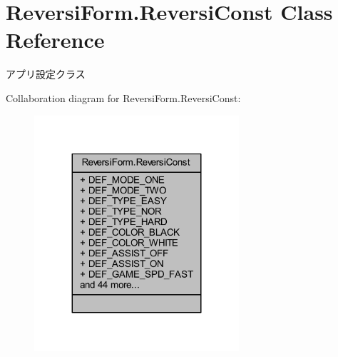 \hypertarget{class_reversi_form_1_1_reversi_const}{}\section{Reversi\+Form.\+Reversi\+Const Class Reference}
\label{class_reversi_form_1_1_reversi_const}


アプリ設定クラス  




Collaboration diagram for Reversi\+Form.\+Reversi\+Const\+:
\nopagebreak
\begin{figure}[H]
\begin{center}
\leavevmode
\includegraphics[width=215pt]{class_reversi_form_1_1_reversi_const__coll__graph}
\end{center}
\end{figure}
